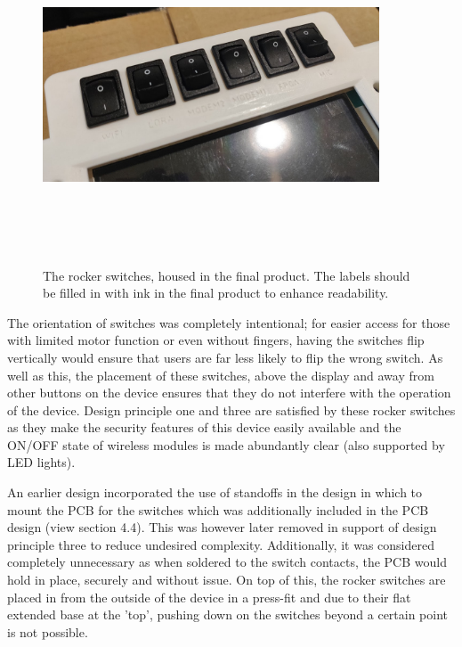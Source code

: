 \begin{figure} [h]
    \centering
    \includegraphics[width=10cm,height=10cm,keepaspectratio]{Figures/hardware_switches.png}
    \caption{The rocker switches, housed in the final product. The labels should be filled in with ink in the final product to enhance readability.}
    \label{fig:Stand}
\end{figure}

The orientation of switches was completely intentional; for easier access for those with limited motor function or even without fingers, having the switches flip vertically would ensure that users are far less likely to flip the wrong switch.
As well as this, the placement of these switches, above the display and away from other buttons on the device ensures that they do not interfere with the operation of the device.
Design principle one and three are satisfied by these rocker switches as they make the security features of this device easily available and the ON/OFF state of wireless modules is made abundantly clear (also supported by LED lights).

An earlier design incorporated the use of standoffs in the design in which to mount the PCB for the switches which was additionally included in the PCB design (view section 4.4). %
This was however later removed in support of design principle three to reduce undesired complexity.
Additionally, it was considered completely unnecessary as when soldered to the switch contacts, the PCB would hold in place, securely and without issue.
On top of this, the rocker switches are placed in from the outside of the device in a press-fit and due to their flat extended base at the 'top', pushing down on the switches beyond a certain point is not possible.


